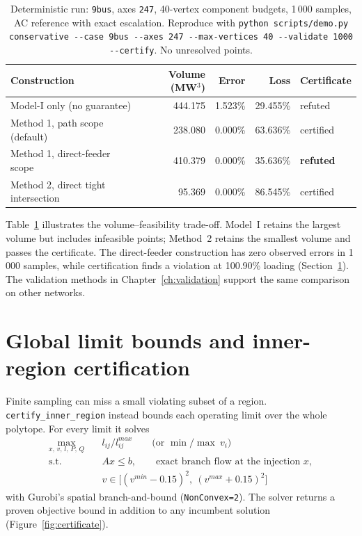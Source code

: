 \documentclass[11pt,a4paper]{report}
\newcommand{\code}[1]{\texttt{\small #1}}
\begin{document}
\begin{table}[h]
\centering\small
\caption{Deterministic run: \code{9bus}, axes \code{247}, 40-vertex component
budgets, 1\,000 samples, AC reference with exact escalation. Reproduce with
\code{python scripts/demo.py conservative -{}-case 9bus -{}-axes 247
-{}-max-vertices 40 -{}-validate 1000 -{}-certify}. No unresolved points.}
\label{tab:audit}
\begin{tabular}{@{}lrrrl@{}}
\toprule
Construction & Volume (MW$^3$) & Error & Loss & Certificate \\
\midrule
Model-I only (no guarantee)          & 444.175 & 1.523\% & 29.455\% & refuted \\
Method 1, path scope (default)       & 238.080 & 0.000\% & 63.636\% & certified \\
Method 1, direct-feeder scope        & 410.379 & 0.000\% & 35.636\% & \textbf{refuted} \\
Method 2, direct tight intersection  & 95.369  & 0.000\% & 86.545\% & certified \\
\bottomrule
\end{tabular}
\end{table}

Table~\ref{tab:audit} illustrates the volume--feasibility trade-off. Model~I
retains the largest volume but includes infeasible points; Method~2 retains the
smallest volume and passes the certificate. The direct-feeder construction has
zero observed errors in 1\,000 samples, while certification finds a violation
at 100.90\% loading (Section~\ref{sec:certificate}). The validation methods in
Chapter~\ref{ch:validation} support the same comparison on other networks.

\section{Global limit bounds and inner-region certification}
\label{sec:certificate}

Finite sampling can miss a small violating subset of a region.
\code{certify\_inner\_region} instead bounds each operating limit over the
whole polytope. For every limit it solves
\begin{align}
\max_{x,\,v,\,l,\,P,\,Q}\quad & l_{ij}/l^{max}_{ij}
  \qquad \bigl(\text{or } \min / \max\ v_i\bigr) \nonumber\\
\text{s.t.}\quad & Ax \le b, \qquad \text{exact branch flow at the injection } x,
  \nonumber\\
& v \in \bigl[(v^{min}-0.15)^2,\ (v^{max}+0.15)^2\bigr]
\end{align}
with Gurobi's spatial branch-and-bound (\code{NonConvex=2}). The solver returns
a proven objective bound in addition to any incumbent solution
(Figure~\ref{fig:certificate}).
\end{document}
